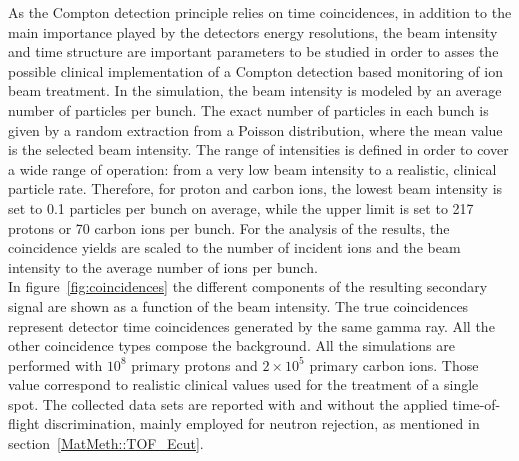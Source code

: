 As the Compton detection principle relies on time coincidences, in addition to the main importance played by the detectors energy resolutions, the beam intensity and time structure are important parameters to be studied in order to asses the possible clinical implementation of a Compton detection based monitoring of ion beam treatment. In the simulation, the beam intensity is modeled by an average number of particles per bunch. The exact number of particles in each bunch is given by a random extraction from a Poisson distribution, where the mean value is the selected beam intensity. The range of intensities is defined in order to cover a wide range of operation: from a very low beam intensity to a realistic, clinical particle rate. Therefore, for proton and carbon ions, the lowest beam intensity is set to 0.1 particles per bunch on average, while the upper limit is set to 217 protons or 70 carbon ions per bunch. For the analysis of the results, the coincidence yields are scaled to the number of incident ions and the beam intensity to the average number of ions per bunch.\\ 
In figure~\ref{fig:coincidences} the different components of the resulting secondary signal are shown as a function of the beam intensity. The true coincidences represent detector time coincidences generated by the same gamma ray. All the other coincidence types compose the background. All the simulations are performed with $10^{8}$ primary protons and  $2\times10^{5}$ primary carbon ions. Those value correspond to realistic clinical values used for the treatment of a single spot. The collected data sets are reported with and without the applied time-of-flight discrimination, mainly employed for neutron rejection, as mentioned in section~\ref{MatMeth::TOF_Ecut}.\\

